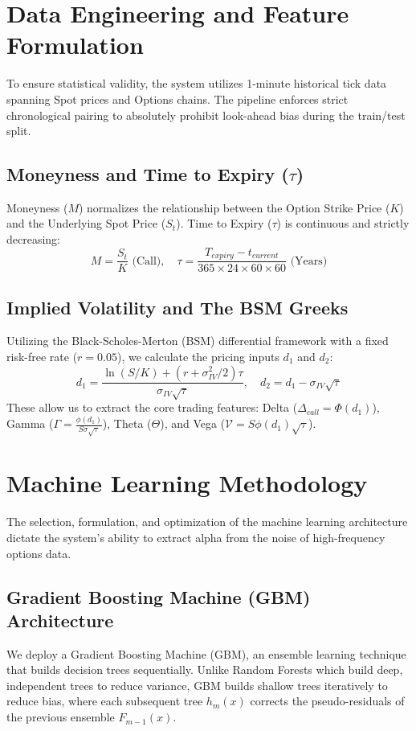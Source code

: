 \documentclass[11pt, a4paper]{article}
\begin{document}
\section{Data Engineering and Feature Formulation}
To ensure statistical validity, the system utilizes 1-minute historical tick data spanning Spot prices and Options chains. The pipeline enforces strict chronological pairing to absolutely prohibit look-ahead bias during the train/test split.

\subsection{Moneyness and Time to Expiry ($\tau$)}
Moneyness ($M$) normalizes the relationship between the Option Strike Price ($K$) and the Underlying Spot Price ($S_t$). Time to Expiry ($\tau$) is continuous and strictly decreasing:
\begin{equation}
    M = \frac{S_t}{K} \text{ (Call)}, \quad \tau = \frac{T_{expiry} - t_{current}}{365 \times 24 \times 60 \times 60} \text{ (Years)}
\end{equation}

\subsection{Implied Volatility and The BSM Greeks}
Utilizing the Black-Scholes-Merton (BSM) differential framework with a fixed risk-free rate ($r = 0.05$), we calculate the pricing inputs $d_1$ and $d_2$:
\begin{equation}
    d_1 = \frac{\ln(S/K) + (r + \sigma_{IV}^2/2)\tau}{\sigma_{IV}\sqrt{\tau}}, \quad d_2 = d_1 - \sigma_{IV}\sqrt{\tau}
\end{equation}
These allow us to extract the core trading features: Delta ($\Delta_{call} = \Phi(d_1)$), Gamma ($\Gamma = \frac{\phi(d_1)}{S\sigma\sqrt{\tau}}$), Theta ($\Theta$), and Vega ($\mathcal{V} = S\phi(d_1)\sqrt{\tau}$).

\section{Machine Learning Methodology}
The selection, formulation, and optimization of the machine learning architecture dictate the system's ability to extract alpha from the noise of high-frequency options data.

\subsection{Gradient Boosting Machine (GBM) Architecture}
We deploy a Gradient Boosting Machine (GBM), an ensemble learning technique that builds decision trees sequentially. Unlike Random Forests which build deep, independent trees to reduce variance, GBM builds shallow trees iteratively to reduce bias, where each subsequent tree $h_m(x)$ corrects the pseudo-residuals of the previous ensemble $F_{m-1}(x)$.
\end{document}
